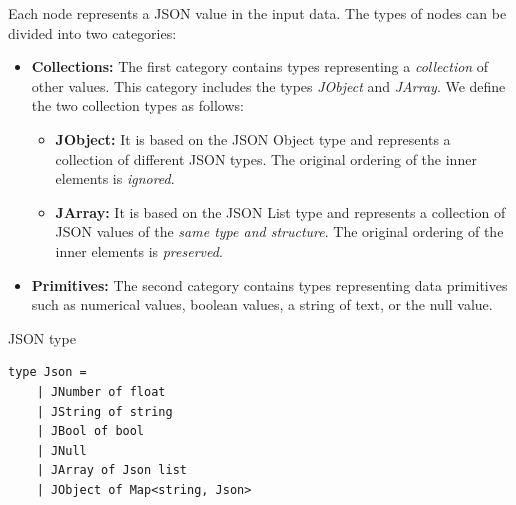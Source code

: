 Each node represents a JSON value in the input data.
The types of nodes can be divided into two categories:
\begin{itemize}
	\item {\textbf{Collections:} The first category contains types representing a \emph{collection} of other values. This category includes the types \emph{JObject} and \emph{JArray}.
	      We define the two collection types as follows:
	      \begin{itemize}
		      \item \textbf{JObject:} It is based on the JSON Object type and represents a collection of different JSON types. The original ordering of the inner elements is \emph{ignored}.
		      \item \textbf{JArray:} It is based on the JSON List type and represents a collection of JSON values of the \emph{same type and structure}. The original ordering of the inner elements is \emph{preserved}.
	      \end{itemize}
	      }
	\item \textbf{Primitives:} The second category contains types representing data primitives such as numerical values, boolean values,
	      a string of text, or the null value.
\end{itemize}

\begin{listing}[htbp]
	\caption {JSON type}
	\label{fig:json}
	\begin{lstlisting}
type Json =
    | JNumber of float
    | JString of string
    | JBool of bool
    | JNull
    | JArray of Json list
    | JObject of Map<string, Json>
  \end{lstlisting}
\end{listing}

